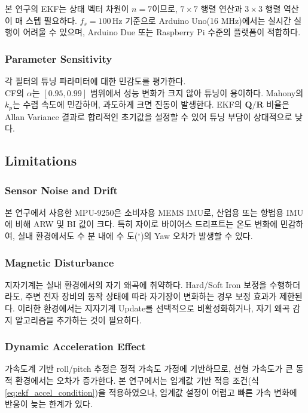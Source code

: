             본 연구의 EKF는 상태 벡터 차원이 $n = 7$이므로, $7\times 7$ 행렬 연산과 $3\times 3$ 행렬 역산이 매 스텝 필요하다. $f_s = 100\,\text{Hz}$ 기준으로 Arduino Uno(16 MHz)에서는 실시간 실행이 어려울 수 있으며, Arduino Due 또는 Raspberry Pi 수준의 플랫폼이 적합하다.\\

        \subsubsection{Parameter Sensitivity}
            각 필터의 튜닝 파라미터에 대한 민감도를 평가한다.\\
    
            CF의 $\alpha$는 $[0.95, 0.99]$ 범위에서 성능 변화가 크지 않아 튜닝이 용이하다. Mahony의 $k_p$는 수렴 속도에 민감하며, 과도하게 크면 진동이 발생한다. EKF의 $\mathbf{Q}/\mathbf{R}$ 비율은 Allan Variance 결과로 합리적인 초기값을 설정할 수 있어 튜닝 부담이 상대적으로 낮다.\\

    \subsection{Limitations}
        \subsubsection{Sensor Noise and Drift}
            본 연구에서 사용한 MPU-9250은 소비자용 MEMS IMU로, 산업용 또는 항법용 IMU에 비해 ARW 및 BI 값이 크다. 특히 자이로 바이어스 드리프트는 온도 변화에 민감하여, 실내 환경에서도 수 분 내에 수 도($^\circ$)의 Yaw 오차가 발생할 수 있다.\\

        \subsubsection{Magnetic Disturbance}
            지자기계는 실내 환경에서의 자기 왜곡에 취약하다. Hard/Soft Iron 보정을 수행하더라도, 주변 전자 장비의 동작 상태에 따라 자기장이 변화하는 경우 보정 효과가 제한된다. 이러한 환경에서는 지자기계 Update를 선택적으로 비활성화하거나, 자기 왜곡 감지 알고리즘을 추가하는 것이 필요하다.\\

        \subsubsection{Dynamic Acceleration Effect}
            가속도계 기반 roll/pitch 추정은 정적 가속도 가정에 기반하므로, 선형 가속도가 큰 동적 환경에서는 오차가 증가한다. 본 연구에서는 임계값 기반 적응 조건(식 \eqref{eq:ekf_accel_condition})을 적용하였으나, 임계값 설정이 어렵고 빠른 가속 변화에 반응이 늦는 한계가 있다.\\

